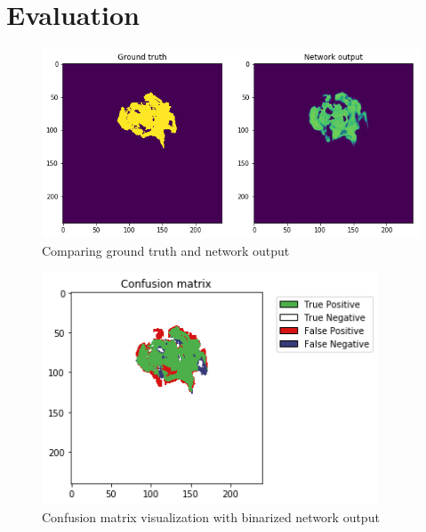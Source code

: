 \section{Evaluation}

\begin{figure}[H]
\centering
\caption{Comparing ground truth and network output}
\includegraphics[width=12cm]{chapters/04_segmentation/images/network_output.png}
\end{figure}

\begin{figure}[H]
\centering
\caption{Confusion matrix visualization with binarized network output}
\includegraphics[width=10cm]{chapters/04_segmentation/images/confusion_matrix.png}
\end{figure}
